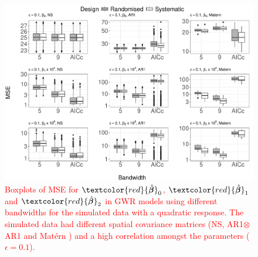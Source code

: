 \documentclass[a4paper]{article} 	%
\newcommand{\Matern}{Mat\'ern }
\newcommand{\zc}[1]{\textcolor{red}{#1}}
\begin{document}
\begin{figure}[!thp]
	\centering
	\includegraphics[width=\linewidth]{Col_QuaCombMSE_newpar_1K_eta01_V4.pdf}
	\caption{\zc{Boxplots of MSE for $\zc{\hat{\bm{\beta}}}_0$, $\zc{\hat{\bm{\beta}}}_1$ and $\zc{\hat{\bm{\beta}}}_2$ in GWR models using different bandwidths for the simulated data with a quadratic response. The simulated data had different spatial covariance matrices (NS, AR1$\otimes$AR1 and \Matern) and a high correlation amongst the parameters ($\epsilon=0.1$).}} \label{fig:QuadBetaMSEeta01}
\end{figure}

\end{document}
